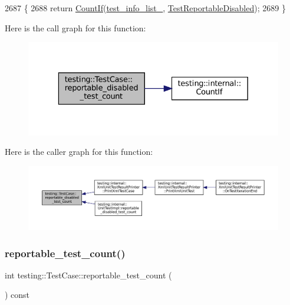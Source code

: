 \begin{DoxyCode}
2687                                                    \{
2688   \textcolor{keywordflow}{return} \hyperlink{namespacetesting_1_1internal_a1e77a774d910346eff11a86d8df783a5}{CountIf}(\hyperlink{classtesting_1_1TestCase_adce272a48399dd67a7bdd14fa7e99b80}{test\_info\_list\_}, \hyperlink{classtesting_1_1TestCase_a1f2da5337f941d746dfcb98bc4acc149}{TestReportableDisabled});
2689 \}
\end{DoxyCode}
Here is the call graph for this function\+:
\nopagebreak
\begin{figure}[H]
\begin{center}
\leavevmode
\includegraphics[width=329pt]{classtesting_1_1TestCase_ad6b34335955967bc361b2fbacd2dd6c9_cgraph}
\end{center}
\end{figure}
Here is the caller graph for this function\+:
\nopagebreak
\begin{figure}[H]
\begin{center}
\leavevmode
\includegraphics[width=350pt]{classtesting_1_1TestCase_ad6b34335955967bc361b2fbacd2dd6c9_icgraph}
\end{center}
\end{figure}
\mbox{\label{classtesting_1_1TestCase_ae4e69f1a77b6aba274981e987e50acab}} 
\subsubsection{\texorpdfstring{reportable\+\_\+test\+\_\+count()}{reportable\_test\_count()}}
{\footnotesize\ttfamily int testing\+::\+Test\+Case\+::reportable\+\_\+test\+\_\+count (\begin{DoxyParamCaption}{ }\end{DoxyParamCaption}) const}



